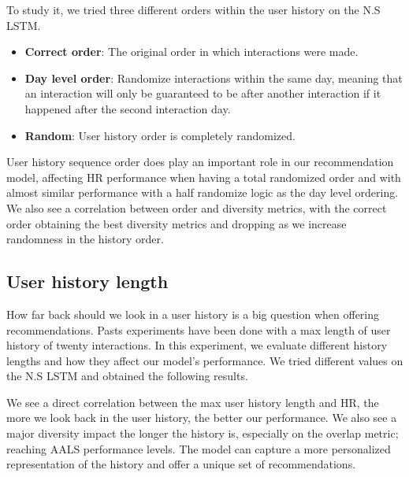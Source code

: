 \documentclass{kththesis}
\begin{document}
To study it, we tried three different orders within the user history on the N.S LSTM. 

\begin{itemize}
    \item \textbf{Correct order}: The original order in which interactions were made.
    \item \textbf{Day level order}: Randomize interactions within the same day, meaning that an interaction will only be guaranteed to be after another interaction if it happened after the second interaction day.
    \item \textbf{Random}: User history order is completely randomized.
\end{itemize}

\begin{center}

\end{center}

User history sequence order does play an important role in our recommendation model, affecting HR performance when having a total randomized order and with almost similar performance with a half randomize logic as the day level ordering. We also see a correlation between order and diversity metrics, with the correct order obtaining the best diversity metrics and dropping as we increase randomness in the history order.


\subsection{User history length}
How far back should we look in a user history is a big question when offering recommendations. Pasts experiments have been done with a max length of user history of twenty interactions. In this experiment, we evaluate different history lengths and how they affect our model's performance. We tried different values on the N.S LSTM and obtained the following results.

\begin{center}

\end{center}


We see a direct correlation between the max user history length and HR, the more we look back in the user history, the better our performance. We also see a major diversity impact the longer the history is, especially on the overlap metric; reaching AALS performance levels. The model can capture a more personalized representation of the history and offer a unique set of recommendations.
\end{document}
